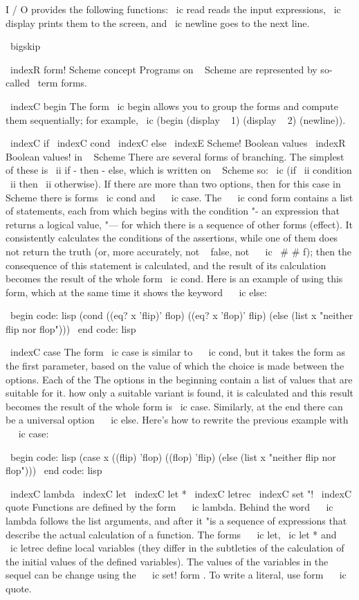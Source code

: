 {{I / O provides the following functions: \ ic {read} reads the input expressions,
\ ic {display} prints them to the screen, and \ ic {newline} goes to the next line.

\ bigskip

\ indexR {form! Scheme concept}
Programs on ~ Scheme are represented by so-called \ term {forms}.

\ indexC {begin}
The form \ ic {begin} allows you to group the forms and compute them sequentially;
for example, \ ic {(begin (display ~ 1) (display ~ 2) (newline))}.

\ indexC {if} \ indexC {cond} \ indexC {else}
\ indexE {Scheme! Boolean values}
\ indexR {Boolean values! in ~ Scheme}
There are several forms of branching. The simplest of these is \ ii {if - then - else},
which is written on ~ Scheme so: \ ic {(if \ ii {condition} \ ii {then}
\ ii {otherwise})}. If there are more than two options, then for this case in ~ Scheme there is
forms \ ic {cond} and ~ \ ic {case}. The ~ \ ic {cond} form contains a list of statements, each
from which begins with the condition "- an expression that returns a logical
value, "--- for which there is a sequence of other forms
(effect). It consistently calculates the conditions of the assertions,
while one of them does not return the truth (or, more accurately, not ~ false, not ~ \ ic { \ # # f}); then
the consequence of this statement is calculated, and the result of its calculation becomes
the result of the whole form \ ic {cond}. Here is an example of using this form, which
at the same time it shows the keyword ~ \ ic {else}:

\ begin {code: lisp}
(cond ((eq? x 'flip)' flop)
      ((eq? x 'flop)' flip)
      (else (list x "neither flip nor flop")))
\ end {code: lisp}

\ indexC {case}
The form \ ic {case} is similar to ~ \ ic {cond}, but it takes the form as the first parameter,
based on the value of which the choice is made between the options. Each of the
The options in the beginning contain a list of values ​​that are suitable for it. how
only a suitable variant is found, it is calculated and this result becomes
the result of the whole form is \ ic {case}. Similarly, at the end there can be a universal
option ~ \ ic {else}. Here's how to rewrite the previous example
with ~ \ ic {case}:

\ begin {code: lisp}
(case x
  ((flip) 'flop)
  ((flop) 'flip)
  (else (list x "neither flip nor flop")))
\ end {code: lisp}

\ indexC {lambda}
\ indexC {let} \ indexC {let *} \ indexC { letrec }
\ indexC {set "!} \ indexC {quote}
Functions are defined by the form ~ \ ic {lambda}. Behind the word ~ \ ic {lambda} follows the list
arguments, and after it "is a sequence of expressions that describe
the actual calculation of a function. The forms ~ \ ic {let}, \ ic {let *} and ~ \ ic {letrec}
define local variables (they differ in the subtleties of the calculation of the initial
values ​​of the defined variables). The values ​​of the variables in the sequel can be
change using the ~ \ ic {set!} form . To write a literal, use
form ~ \ ic {quote}.

}}

